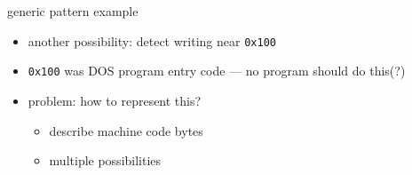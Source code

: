 
\begin{frame}{generic pattern example}
    \begin{itemize}
    \item another possibility: detect writing near {\tt 0x100}
    \item {\tt 0x100} was DOS program entry code  --- no program should do this(?)
    \item problem: how to represent this?
    \begin{itemize}
        \item describe machine code bytes
        \item multiple possibilities
        \end{itemize}
    \end{itemize}
\end{frame}
